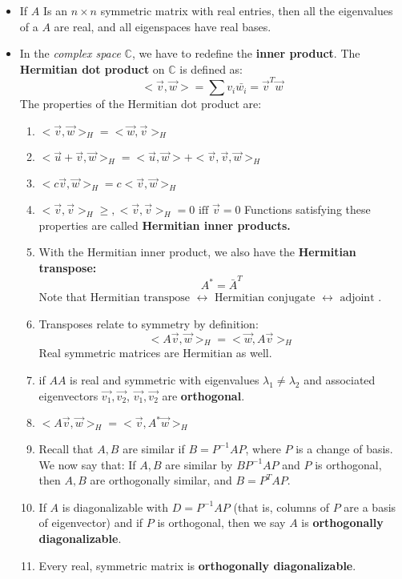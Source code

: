 \documentclass[10pt,letterpaper]{article}
\begin{document}
\begin{itemize}
\item If $A$ Is an $n \times n$ symmetric matrix with real entries, then all the eigenvalues of a $A$ are real, and all eigenspaces have real bases. 

\item In the \textit{complex space }$\mathbb{C}$, we have to redefine the \textbf{inner product}. The \textbf{Hermitian dot product} on $\mathbb{C}$ is defined as: 
$$<\vec{v},\vec{w}>=\sum v_i\bar{w_i}=\vec{v}^T\vec{w}$$
The properties of the Hermitian dot product are: 
\begin{enumerate}
\item $<\vec{v}, \vec{w}>_H=<\vec{w}, \vec{v}>_H$
\item $<\vec{u}+\vec{v},\vec{w}>_H=<\vec{u},\vec{w}>+<\vec{v},\vec{v},\vec{w}>_H$
\item $<c\vec{v},\vec{w}>_H=c<\vec{v},\vec{w}>_H$
\item $<\vec{v},\vec{v}>_H\geq , <\vec{v},\vec{v}>_H=0 \mbox{ iff } \vec{v}=0$
Functions satisfying these properties are called \textbf{Hermitian inner products.}

\item With the Hermitian inner product, we also have the \textbf{Hermitian transpose:}
$$A^*=\bar{A}^T$$ 
Note that $\mbox{Hermitian transpose } \leftrightarrow \mbox{ Hermitian conjugate } \leftrightarrow \mbox{ adjoint }$. 
\item Transposes relate to symmetry by definition: 
$$ <A\vec{v},\vec{w}>_H=<\vec{w},A\vec{v}>_H$$ 
Real symmetric matrices are Hermitian as well. 

\item if $AA$ is real and symmetric with eigenvalues $\lambda_1 \neq \lambda_2$ and associated eigenvectors $\vec{v_1}, \vec{v_2}$, $\vec{v_1}, \vec{v_2}$ are \textbf{orthogonal}. 

\item $<A\vec{v}, \vec{w}>_H=<\vec{v},A^*\vec{w}>_H$

\item Recall that $A, B$ are similar if $B=P^{-1}AP$, where $P$ is a change of basis. We now say that: 
If $A,B$ are similar by $BP^{-1}AP$ and $P$ is orthogonal, then $A, B$ are orthogonally similar, and $B=P^TAP$. 
\item If $A$ is diagonalizable with $D=P^{-1}AP$ (that is, columns of $P$ are a basis of eigenvector) and if $P$ is orthogonal, then we say $A$ is \textbf{orthogonally diagonalizable}. 

\item Every real, symmetric matrix is \textbf{orthogonally diagonalizable}. 


\end{enumerate}




\end{itemize}
\end{document}
